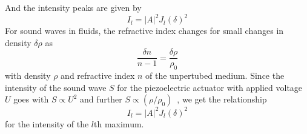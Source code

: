 And the intensity peaks are given by
\begin{equation}
    I_l = |A|^2 J_l(\delta)^2
\end{equation}
For sound waves in fluids, the refractive index changes for small changes in density $\delta \rho$ as 
\begin{equation}
    \frac{\delta n }{n - 1} = \frac{\delta \rho}{\rho_0}
\end{equation}
with density $\rho$ and refractive index $n$ of the unpertubed medium. Since the intensity of the sound 
wave $S$ for the piezoelectric actuator with applied voltage $U$ goes with $S \propto U^2$ and further 
$S \propto (\rho / \rho_0)$~\cite{ver}, we get the relationship 
\begin{equation}
    I_l = |A|^2 J_l(\delta)^2
\end{equation}
for the intensity of the $l$th maximum.

